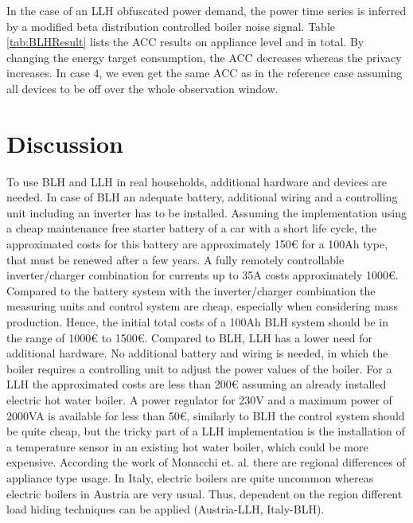 \documentclass{article}
\begin{document}
In the case of an \ac{LLH} obfuscated power demand, the power time series is inferred by a modified beta distribution controlled boiler noise signal. 
Table \ref{tab:BLHResult} lists the \ac{ACC} results on appliance level and in total.
By changing the energy target consumption, the \ac{ACC} decreases whereas the privacy increases.
In case $4$, we even get the same \ac{ACC} as in the reference case assuming all devices to be off over the whole observation window.




\section{Discussion}\label{sec:discussion}

To use \ac{BLH} and \ac{LLH} in real households, additional hardware and devices are needed.
In case of \ac{BLH} an adequate battery, additional wiring and a controlling unit including an inverter has to be installed. 
Assuming the implementation using a cheap maintenance free starter battery of a car with a short life cycle, the approximated costs for this battery are approximately 150\euro\: for a 100\:Ah type, that must be renewed after a few years. A fully remotely controllable inverter/charger combination for currents up to 35\:A costs approximately 1000\euro\:\cite{Prokop2014}. Compared to the battery system with the inverter/charger combination the measuring units and control system are cheap, especially when considering mass production. Hence, the initial total costs of a 100\:Ah \ac{BLH} system should be in the range of 1000\euro\: to 1500\euro\:\cite{Prokop2014}.
Compared to \ac{BLH}, \ac{LLH} has a lower need for additional hardware.
No additional battery and wiring is needed, in which the boiler requires a controlling unit to adjust the power values of the boiler.
For a \ac{LLH} the approximated costs are less than 200\euro \: assuming an already installed electric hot water boiler. A power regulator for 230\:V and a maximum power of 2000\:VA is available for less than 50\euro, similarly to \ac{BLH} the control system should be quite cheap, but the tricky part of a \ac{LLH} implementation is the installation of a temperature sensor in an existing hot water boiler, which could be more expensive.
According the work of Monacchi et. al. \cite{monacchi2013Nov} there are regional differences of appliance type usage.
In Italy, electric boilers are quite uncommon whereas electric boilers in Austria are very usual. 
Thus, dependent on the region different load hiding techniques can be applied (Austria-\ac{LLH}, Italy-\ac{BLH}). 
\end{document}
